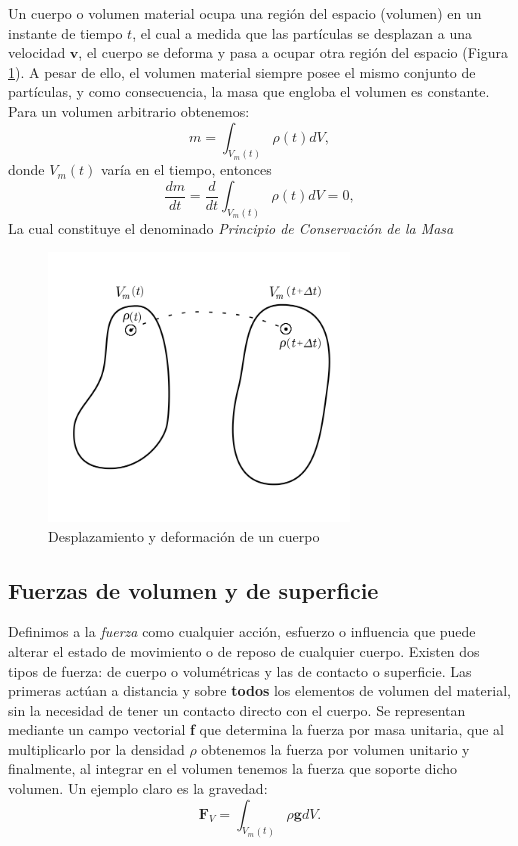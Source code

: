 \documentclass[a4paper,10pt, oneside]{book}
\begin{document}
Un cuerpo o volumen material ocupa una región del espacio (volumen) en un instante de tiempo $t$, el cual a medida que las partículas se desplazan a una velocidad $\mathbf{v}$, el cuerpo se deforma y pasa a ocupar otra región del espacio (Figura \ref{img:1-2}). A pesar de ello, el volumen material siempre posee el mismo conjunto de partículas, y como consecuencia, la masa que engloba el volumen es constante. Para un volumen arbitrario obtenemos:
\begin{equation}
	m = \int_{V_m (t)} \rho(t)dV, \nonumber
\end{equation}
donde $V_m(t)$ varía en el tiempo, entonces
\begin{equation}
	\frac{dm}{dt} = \frac{d}{dt} \int_{V_m (t)} \rho(t)dV = 0, \nonumber
\end{equation}
La cual constituye el denominado \textit{Principio de Conservación de la Masa}
\begin{figure}[htb]
    \begin{center}
      \includegraphics[width=8cm]{Img/1-2}
		\caption{Desplazamiento y deformación de un cuerpo}      
      \label{img:1-2}
    \end{center}
  \end{figure}

\subsection{Fuerzas de volumen y de superficie}

Definimos a la \textit{fuerza} como cualquier acción, esfuerzo o influencia que puede alterar el estado de movimiento o de reposo de cualquier cuerpo. Existen dos tipos de fuerza: de cuerpo o volumétricas y las de contacto o superficie. Las primeras actúan a distancia y sobre \textbf{todos} los elementos de volumen del material, sin la necesidad de tener un contacto directo con el cuerpo. Se representan mediante un campo vectorial \textbf{f} que determina la fuerza por masa unitaria, que al multiplicarlo por la densidad $\rho$ obtenemos la fuerza por volumen unitario y finalmente, al integrar en el volumen tenemos la fuerza que soporte dicho volumen. Un ejemplo claro es la gravedad:
\begin{equation}
	\mathbf{F}_V = \int_{V_m(t)} \rho \mathbf{g} dV. \nonumber
\end{equation}
\end{document}

